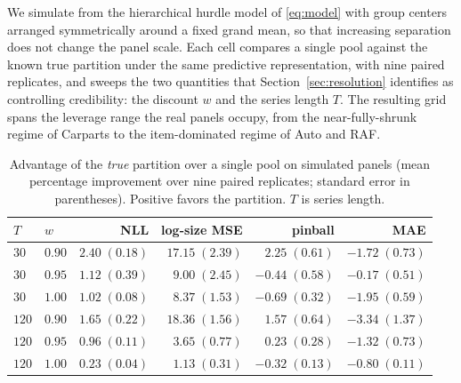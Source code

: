 We simulate from the hierarchical hurdle model of \eqref{eq:model} with
group centers arranged symmetrically around a fixed grand mean, so that
increasing separation does not change the panel scale. Each cell compares
a single pool against the known true partition under the same predictive
representation, with nine paired replicates, and sweeps the two quantities
that Section~\ref{sec:resolution} identifies as controlling credibility:
the discount $w$ and the series length $T$. The resulting grid spans the
leverage range the real panels occupy, from the near-fully-shrunk regime
of Carparts to the item-dominated regime of Auto and RAF.

\begin{table}[t]
\centering
\caption{Advantage of the \emph{true} partition over a single pool on
simulated panels (mean percentage improvement over nine paired replicates;
standard error in parentheses). Positive favors the partition. $T$ is
series length.}
\label{tab:sanity}
\small
\setlength{\tabcolsep}{3.5pt}
\begin{tabular}{llrrrr}
\toprule
$T$ & $w$ & NLL & log-size MSE & pinball & MAE\\
\midrule
$30$ & $0.90$ & $2.40\;(0.18)$ & $17.15\;(2.39)$ & $2.25\;(0.61)$ & $-1.72\;(0.73)$\\
$30$ & $0.95$ & $1.12\;(0.39)$ & $9.00\;(2.45)$ & $-0.44\;(0.58)$ & $-0.17\;(0.51)$\\
$30$ & $1.00$ & $1.02\;(0.08)$ & $8.37\;(1.53)$ & $-0.69\;(0.32)$ & $-1.95\;(0.59)$\\
$120$ & $0.90$ & $1.65\;(0.22)$ & $18.36\;(1.56)$ & $1.57\;(0.64)$ & $-3.34\;(1.37)$\\
$120$ & $0.95$ & $0.96\;(0.11)$ & $3.65\;(0.77)$ & $0.23\;(0.28)$ & $-1.32\;(0.73)$\\
$120$ & $1.00$ & $0.23\;(0.04)$ & $1.13\;(0.31)$ & $-0.32\;(0.13)$ & $-0.80\;(0.11)$\\
\bottomrule
\end{tabular}
\end{table}

